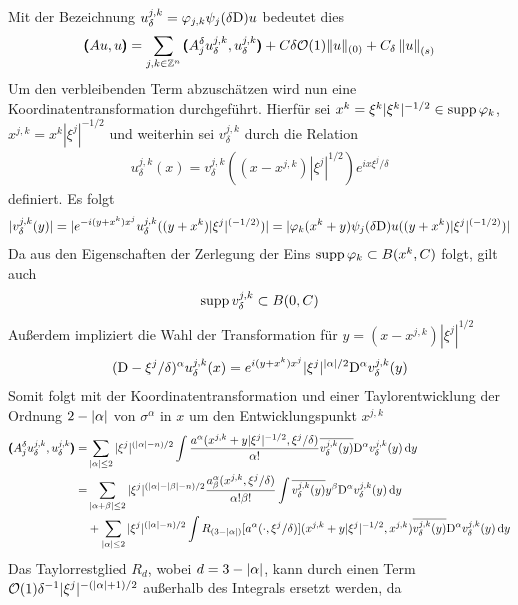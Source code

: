 Mit der Bezeichnung $u_\delta^{j,k} = \varphi_{j,k} \psi_j(\delta\mathrm D)u$ bedeutet dies
\begin{align}
\pmb(Au,u\pmb) = \sum_{j,k\in\mathbb Z^n} \pmb(A^\delta_j u_\delta^{j,k},u_\delta^{j,k}\pmb) + C\delta\mathcal O(1)\lVert u\rVert _{(0)} + C_\delta \left\lVert u\right\rVert _{(s)}
\end{align}
Um den verbleibenden Term abzuschätzen wird nun eine Koordinatentransformation durchgeführt. Hierfür sei $x^k = \xi^k |\xi^k|^{-1/2}\in\operatorname{supp} \varphi_k$, $x^{j,k}=x^k |\xi^j|^{-1/2}$ und weiterhin sei $v^{j,k}_\delta$ durch die Relation
\begin{align}
u^{j,k}_\delta(x) = v^{j,k}_\delta ((x-x^{j,k})|\xi^j|^{1/2}) e^{ix\xi^j/\delta}
\end{align}
definiert. Es folgt
\begin{align}
|v^{j,k}_\delta(y)| = \lvert e^{-i(y+x^k)x^j}u^{j,k}_\delta((y+x^k)|\xi^j|^{(-1/2)})\rvert = |\varphi_k(x^k+y)\psi_j(\delta\mathrm D)u((y+x^k)|\xi^j|^{(-1/2)})|
\end{align}
Da aus den Eigenschaften der Zerlegung der Eins $\operatorname{supp} \varphi_k \subset B(x^k,C)$ folgt, gilt auch
\begin{align}
\operatorname{supp} v^{j,k}_\delta \subset B(0,C)
\end{align}
Außerdem impliziert die Wahl der Transformation für $y=(x-x^{j,k})|\xi^j|^{1/2}$
\begin{align}
(\mathrm D - \xi^j/\delta)^\alpha u^{j,k}_\delta(x)=  e^{i(y+x^k)x^j}|\xi^j|^{\lvert\alpha\rvert/2}\mathrm D^\alpha v^{j,k}_\delta(y)
\end{align}
Somit folgt mit der Koordinatentransformation und einer Taylorentwicklung der Ordnung $2-\lvert\alpha\rvert$ von $\sigma^\alpha$ in $x$ um den Entwicklungspunkt $x^{j,k}$
\begin{align}
\pmb(A^\delta_j u_\delta^{j,k},u_\delta^{j,k}\pmb)
=& \sum_{\lvert\alpha\rvert\le 2} |\xi^j|^{(\lvert\alpha\rvert-n)/2}\int \frac{a^\alpha(x^{j,k}+y|\xi^j|^{-1/2},\xi^j/\delta)}{\alpha!}\overline{v^{j,k}_\delta(y)}\mathrm D^\alpha v^{j,k}_\delta(y)\,\mathrm d y\nonumber\\ \label{termnachkoordtransf}
=& \sum_{\lvert\alpha+\beta\rvert\le 2}|\xi^j|^{(\lvert\alpha\rvert-\lvert\beta\rvert-n)/2} \frac{a^\alpha_\beta(x^{j,k},\xi^j/\delta)}{\alpha!\beta!}\int\overline{v^{j,k}_\delta(y)}y^\beta\mathrm D^\alpha v^{j,k}_\delta(y)\,\mathrm d y\\
&+\sum_{\lvert\alpha\rvert\le 2}|\xi^j|^{(\lvert\alpha\rvert-n)/2}\int R_{(3-\lvert\alpha\rvert)}[a^\alpha(\cdot,\xi^j/\delta)](x^{j,k}+y|\xi^j|^{-1/2},x^{j,k})\overline{v^{j,k}_\delta(y)}\mathrm D^\alpha v^{j,k}_\delta(y)\,\mathrm d y\nonumber
\end{align}
Das Taylorrestglied $R_d$, wobei $d=3-\lvert\alpha\rvert$, kann durch einen Term $\mathcal O(1)\delta^{-1}|\xi^j|^{-(\lvert\alpha\rvert+1)/2}$ außerhalb des Integrals ersetzt werden, da
